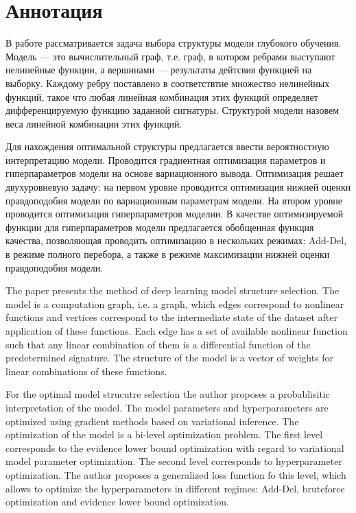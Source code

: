 \documentclass[12pt]{article}
\begin{document}
\section{Аннотация}
В работе рассматривается задача выбора структуры модели глубокого обучения.
Модель --- это вычислительный граф, т.е. граф, в котором ребрами выступают нелинейные функции, а вершинами --- результаты дейтсвия функцией на выборку.  Каждому ребру поставлено в соответствтие множество нелинейных функций, такое что любая линейная комбинация этих функций определяет дифференцируемую функцию заданной сигнатуры. Структурой модели назовем веса линейной комбинации этих функций. 

Для нахождения оптимальной структуры предлагается ввести вероятностную интерпретацию  модели.
Проводится градиентная оптимизация параметров и гиперпараметров модели на основе вариационного вывода. Оптимизация решает двухуровневую задачу: на первом уровне проводится оптимизация нижней оценки правдоподобия модели по вариационным параметрам модели. На втором уровне проводится оптимизация гиперпараметров моделии. В качестве оптимизируемой функции для гиперпараметров модели предлагается обобщенная функция качества, позволяющая проводить оптимизацию в нескольких режимах: Add-Del, в режиме полного перебора, а также в режиме максимизации нижней оценки правдоподобия модели.


The paper presents the method of deep learning model structure selection. 
The model is a computation graph, i.e. a graph, which edges correspond to nonlinear functions and vertices correspond to the intermediate state of the dataset after application of these functions.
Each edge has a set of available nonlinear function such that any linear combination of them is a differential function of the predetermined signature. The structure of the model is a vector of weights for linear combinations of these functions.

For the optimal model strucutre selection the author proposes a probablisitic interpretation of the model. The model parameters and hyperparameters are optimized using gradient methods based on variational inference. The optimization of the model is a bi-level optimization problem. The first level corresponds to the evidence lower bound optimization with regard to  variational model parameter optimization. The second level corresponds to hyperparameter optimization. The author proposes a generalized loss function fo this level, which allows to optimize the hyperparameters in different regimes: Add-Del, bruteforce optimization and evidence lower bound optimization. 
\end{document}
